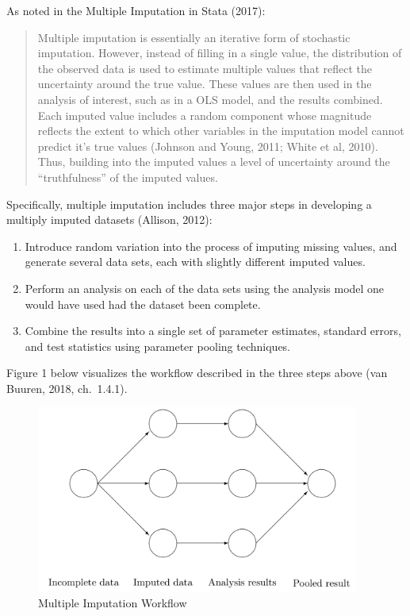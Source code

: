 \documentclass[12pt,oneside]{chicagocapstone}
\providecommand{\tightlist}{%
  \setlength{\itemsep}{0pt}\setlength{\parskip}{0pt}}
\begin{document}
As noted in the Multiple Imputation in Stata (2017):
\begin{quote}
Multiple imputation is essentially an iterative form of stochastic
imputation. However, instead of filling in a single value, the
distribution of the observed data is used to estimate multiple values
that reflect the uncertainty around the true value. These values are
then used in the analysis of interest, such as in a OLS model, and the
results combined. Each imputed value includes a random component whose
magnitude reflects the extent to which other variables in the imputation
model cannot predict it's true values (Johnson and Young, 2011; White et
al, 2010). Thus, building into the imputed values a level of uncertainty
around the ``truthfulness'' of the imputed values.
\end{quote}
Specifically, multiple imputation includes three major steps in
developing a multiply imputed datasets (Allison, 2012):
\begin{enumerate}
\def\labelenumi{\arabic{enumi}.}
\tightlist
\item
  Introduce random variation into the process of imputing missing
  values, and generate several data sets, each with slightly different
  imputed values.
\item
  Perform an analysis on each of the data sets using the analysis model
  one would have used had the dataset been complete.
\item
  Combine the results into a single set of parameter estimates, standard
  errors, and test statistics using parameter pooling techniques.
\end{enumerate}
Figure 1 below visualizes the workflow described in the three steps
above (van Buuren, 2018, ch.~1.4.1).
\begin{figure}

{\centering \includegraphics[width=400px]{figure/multiple-imputation-workflow} 

}

\caption{Multiple Imputation Workflow}\label{fig:mutlipleimputationworkflow}
\end{figure}
\end{document}
